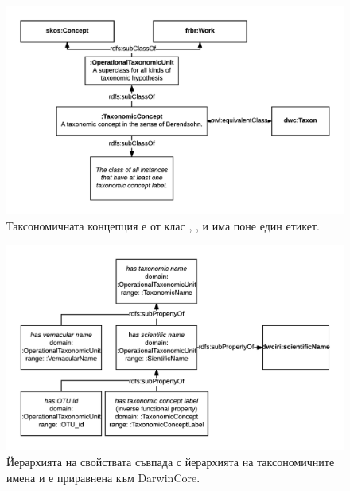 \begin{figure}[h!]
\centering
  \includegraphics[width=\textwidth]{Figures/taxonomic-concept-diagram}
  \decoRule
  \caption[Taxonomic concept diagram.]{
  Таксономичната концепция е от клас , ,  и има поне един етикет.}
  \label{taxonomic-concept-diagram}
\end{figure}



\begin{figure}[h!]
\centering
  \includegraphics[width=\textwidth]{Figures/name-property-hierarchy}
  \decoRule
  \caption[Taxonomic name property hierarchy diagram.]
  {Йерархията на свойствата съвпада с йерархията на таксономичните имена и е приравнена към DarwinCore.}
  \label{name-property-hierarchy}
\end{figure}



